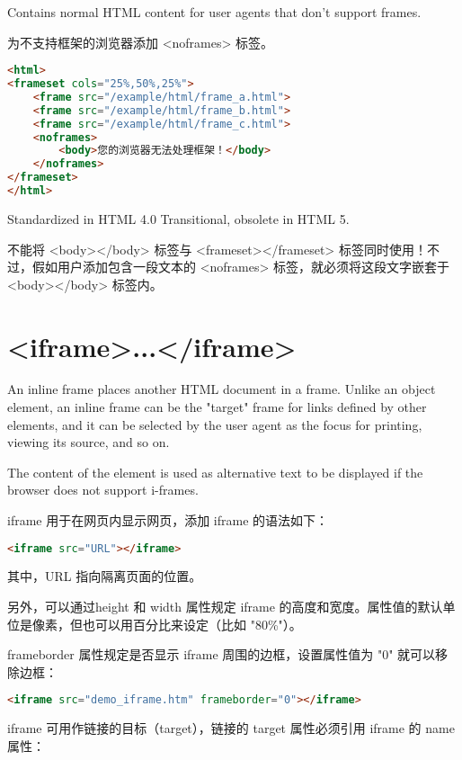 Contains normal HTML content for user agents that don't support frames.

为不支持框架的浏览器添加 <noframes> 标签。

\begin{lstlisting}[language=HTML]
<html>
<frameset cols="25%,50%,25%">
	<frame src="/example/html/frame_a.html">
	<frame src="/example/html/frame_b.html">
	<frame src="/example/html/frame_c.html">
	<noframes>
		<body>您的浏览器无法处理框架！</body>
	</noframes>
</frameset>
</html>
\end{lstlisting}

Standardized in HTML 4.0 Transitional, obsolete in HTML 5.

不能将 <body></body> 标签与 <frameset></frameset> 标签同时使用！不过，假如用户添加包含一段文本的 <noframes> 标签，就必须将这段文字嵌套于 <body></body> 标签内。

\section{<iframe>...</iframe>}

An inline frame places another HTML document in a frame. Unlike an object element, an inline frame can be the "target" frame for links defined by other elements, and it can be selected by the user agent as the focus for printing, viewing its source, and so on.

The content of the element is used as alternative text to be displayed if the browser does not support i-frames.

iframe 用于在网页内显示网页，添加 iframe 的语法如下：

\begin{lstlisting}[language=HTML]
	<iframe src="URL"></iframe>
\end{lstlisting}

其中，URL 指向隔离页面的位置。

另外，可以通过height 和 width 属性规定 iframe 的高度和宽度。属性值的默认单位是像素，但也可以用百分比来设定（比如 "80\%"）。





frameborder 属性规定是否显示 iframe 周围的边框，设置属性值为 "0" 就可以移除边框：

\begin{lstlisting}[language=HTML]
	<iframe src="demo_iframe.htm" frameborder="0"></iframe>
\end{lstlisting}

iframe 可用作链接的目标（target），链接的 target 属性必须引用 iframe 的 name 属性：

